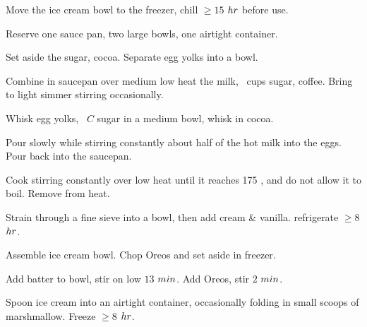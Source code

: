 \begin{preparation}
\item Move the ice cream bowl to the freezer, chill $\ge15$ $\hour$ before use.

\item Reserve one sauce pan, two large bowls, one airtight container.

\item Set aside the sugar, cocoa.
	Separate egg yolks into a bowl.

\item Combine in saucepan over medium low heat the milk, \onehalf~cups sugar, coffee.
	Bring to light simmer stirring occasionally.

\item Whisk egg yolks, \onefourth~$C$ sugar in a medium bowl, whisk in cocoa.

\item Pour slowly while stirring constantly about half of the hot milk into the eggs.
	Pour back into the saucepan.

\item Cook stirring constantly over low heat until it reaches 175 \Fahrenheit, and do not allow it to boil.
	Remove from heat.

\item Strain through a fine sieve into a bowl, then add cream \& vanilla.
	refrigerate $\ge8$ $\hour$.

\item Assemble ice cream bowl.
	Chop Oreos and set aside in freezer.

\item Add batter to bowl, stir on low $13$ $\minute$.
	Add Oreos, stir $2$ $\minute$.

\item Spoon ice cream into an airtight container, occasionally folding in small scoops of marshmallow.
	Freeze $\ge8$ $\hour$.
\end{preparation}


\recipeend
